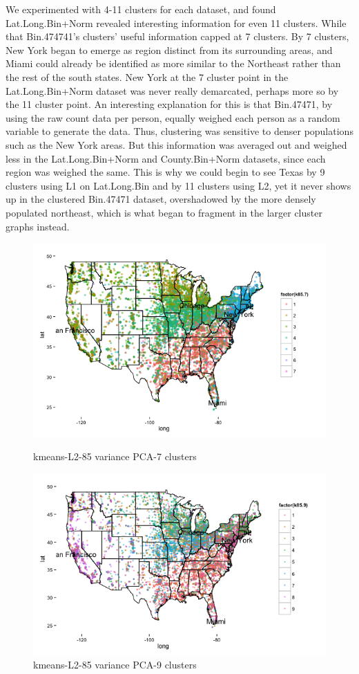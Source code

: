 \documentclass{article}\usepackage[]{graphicx}\usepackage[]{color}
\begin{document}
 We experimented with 4-11 clusters for each dataset, and found Lat.Long.Bin+Norm revealed interesting information for even 11 clusters.  While that Bin.474741's clusters' useful information capped at 7 clusters.  By 7 clusters, New York began to emerge as region distinct from its surrounding areas, and Miami could already be identified as more similar to the Northeast rather than the rest of the south states.  New York at the 7 cluster point in the Lat.Long.Bin+Norm dataset was never really demarcated, perhaps more so by the 11 cluster point.  An interesting explanation for this is that Bin.47471, by using the raw count data per person, equally weighed each person as a random variable to generate the data.  Thus, clustering was sensitive to denser populations such as the New York areas.  But this information was averaged out and weighed less in the Lat.Long.Bin+Norm and County.Bin+Norm datasets, since each region was weighed the same.  This is why we could begin to see Texas by 9 clusters using L1 on Lat.Long.Bin and by 11 clusters using L2, yet it never shows up in the clustered Bin.47471 dataset, overshadowed by the more densely populated northeast, which is what began to fragment in the larger cluster graphs instead.  

\begin{figure}[H]

\begin{minipage}{.5\textwidth}
\includegraphics[width=250pts, height=150pts]{85_7.png}
\caption{kmeans-L2-85 variance PCA-7 clusters}
\end{minipage}
\begin{minipage}{.5\textwidth}
\includegraphics[width = 250pts, height=150pts]{85_9.png}
\caption{kmeans-L2-85 variance PCA-9 clusters}
\end{minipage}
\end{figure}
\end{document}
